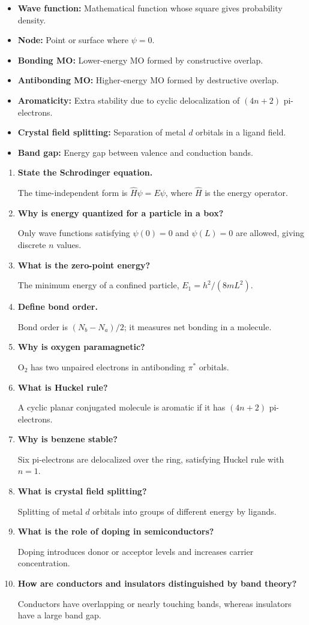 \documentclass[12pt,a4paper]{article}
\newcommand{\Q}[1]{\textbf{#1}\par\noindent\ignorespaces}
\begin{document}
\begin{tcolorbox}[defbox, title={One-Line Definitions}]
\begin{itemize}[leftmargin=*, itemsep=2pt, topsep=2pt]
  \item \textbf{Wave function:} Mathematical function whose square gives probability density.
  \item \textbf{Node:} Point or surface where $\psi=0$.
  \item \textbf{Bonding MO:} Lower-energy MO formed by constructive overlap.
  \item \textbf{Antibonding MO:} Higher-energy MO formed by destructive overlap.
  \item \textbf{Aromaticity:} Extra stability due to cyclic delocalization of $(4n+2)$ pi-electrons.
  \item \textbf{Crystal field splitting:} Separation of metal $d$ orbitals in a ligand field.
  \item \textbf{Band gap:} Energy gap between valence and conduction bands.
\end{itemize}
\end{tcolorbox}

\begin{tcolorbox}[exambox, title={Frequently Asked / Viva Questions}]
\begin{enumerate}[topsep=0pt, label=\textbf{Q\arabic*.}, itemsep=5pt]
  \item \Q{State the Schrodinger equation.}
    The time-independent form is $\hat{H}\psi=E\psi$, where $\hat{H}$ is the energy operator.
  \item \Q{Why is energy quantized for a particle in a box?}
    Only wave functions satisfying $\psi(0)=0$ and $\psi(L)=0$ are allowed, giving discrete $n$ values.
  \item \Q{What is the zero-point energy?}
    The minimum energy of a confined particle, $E_1=h^2/(8mL^2)$.
  \item \Q{Define bond order.}
    Bond order is $(N_b-N_a)/2$; it measures net bonding in a molecule.
  \item \Q{Why is oxygen paramagnetic?}
    $\mathrm{O_2}$ has two unpaired electrons in antibonding $\pi^*$ orbitals.
  \item \Q{What is Huckel rule?}
    A cyclic planar conjugated molecule is aromatic if it has $(4n+2)$ pi-electrons.
  \item \Q{Why is benzene stable?}
    Six pi-electrons are delocalized over the ring, satisfying Huckel rule with $n=1$.
  \item \Q{What is crystal field splitting?}
    Splitting of metal $d$ orbitals into groups of different energy by ligands.
  \item \Q{What is the role of doping in semiconductors?}
    Doping introduces donor or acceptor levels and increases carrier concentration.
  \item \Q{How are conductors and insulators distinguished by band theory?}
    Conductors have overlapping or nearly touching bands, whereas insulators have a large band gap.
\end{enumerate}
\end{tcolorbox}
\end{document}

